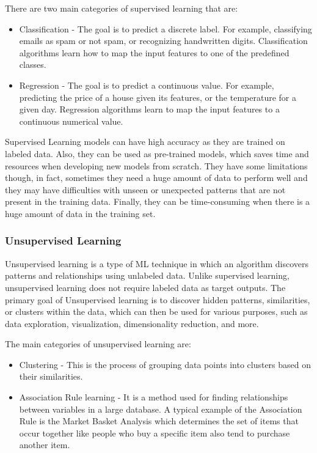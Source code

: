 There are two main categories of supervised learning that are:
\begin{itemize}
    \item Classification - The goal is to predict a discrete label.
    For example, classifying emails as spam or not spam, or recognizing handwritten digits.
    Classification algorithms learn how to map the input features to one of the predefined classes.

    \item Regression - The goal is to predict a continuous value.
    For example, predicting the price of a house given its features, or the temperature for a given day.
    Regression algorithms learn to map the input features to a continuous numerical value.

\end{itemize}

Supervised Learning models can have high accuracy as they are trained on labeled data. Also, they can be used as pre-trained models, which saves time and resources when developing new models from scratch.
They have some limitations though, in fact, sometimes they need a huge amount of data to perform well and they may have difficulties with unseen or unexpected patterns that are not present in the training data. Finally, they can be time-consuming when there is a huge amount of data in the training set.

\subsubsection{Unsupervised Learning}
\label{subsubsec:unsupervised_ml}
Unsupervised learning is a type of ML technique in which an algorithm discovers patterns and relationships using unlabeled data.
Unlike supervised learning, unsupervised learning does not require labeled data as target outputs.
The primary goal of Unsupervised learning is to discover hidden patterns, similarities, or clusters within the data, which can then be used for various purposes, such as data exploration, visualization, dimensionality reduction, and more.


The main categories of unsupervised learning are:
\begin{itemize}
    \item Clustering - This is the process of grouping data points into clusters based on their similarities.

    \item Association Rule learning - It is a method used for finding relationships between variables in a large database. A typical example of the Association Rule is the Market Basket Analysis which determines the set of items that occur together like people who buy a specific item also tend to purchase another item.

\end{itemize}

